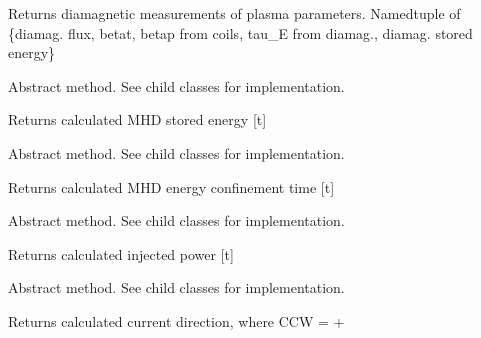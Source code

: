 \documentclass[letterpaper,10pt,english]{sphinxmanual}
\begin{document}
\begin{fulllineitems}
\begin{fulllineitems}
Returns diamagnetic measurements of plasma parameters.
Namedtuple of \{diamag. flux, betat, betap from coils, tau\_E from diamag., diamag. stored energy\}

\end{fulllineitems}


\begin{fulllineitems}
\label{eqtools:eqtools.core.Equilibrium.getWMHD}
Abstract method.  See child classes for implementation.

Returns calculated MHD stored energy {[}t{]}

\end{fulllineitems}


\begin{fulllineitems}
\label{eqtools:eqtools.core.Equilibrium.getTauMHD}
Abstract method.  See child classes for implementation.

Returns calculated MHD energy confinement time {[}t{]}

\end{fulllineitems}


\begin{fulllineitems}
\label{eqtools:eqtools.core.Equilibrium.getPinj}
Abstract method.  See child classes for implementation.

Returns calculated injected power {[}t{]}

\end{fulllineitems}


\begin{fulllineitems}
\label{eqtools:eqtools.core.Equilibrium.getCurrentSign}
Abstract method.  See child classes for implementation.

Returns calculated current direction, where CCW = +

\end{fulllineitems}



\end{fulllineitems}
\end{document}
